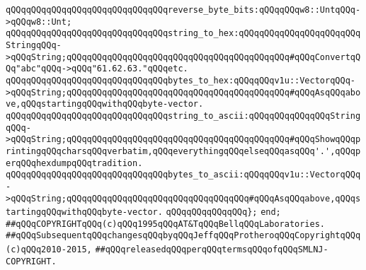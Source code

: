 \newline
\verb|qQQqqQQqqQQqqQQqqQQqqQQqqQQqqQQqreverse_byte_bits:qQQqqQQqw8::UntqQQq->qQQqw8::Unt;|\newline
\newline
\verb|qQQqqQQqqQQqqQQqqQQqqQQqqQQqqQQqstring_to_hex:qQQqqQQqqQQqqQQqqQQqqQQqStringqQQq->qQQqString;qQQqqQQqqQQqqQQqqQQqqQQqqQQqqQQqqQQqqQQqqQQq#qQQqConvertqQQq"abc"qQQq->qQQq"61.62.63."qQQqetc.|\newline
\verb|qQQqqQQqqQQqqQQqqQQqqQQqqQQqqQQqbytes_to_hex:qQQqqQQqv1u::VectorqQQq->qQQqString;qQQqqQQqqQQqqQQqqQQqqQQqqQQqqQQqqQQqqQQqqQQq#qQQqAsqQQqabove,qQQqstartingqQQqwithqQQqbyte-vector.|\newline
\newline
\verb|qQQqqQQqqQQqqQQqqQQqqQQqqQQqqQQqstring_to_ascii:qQQqqQQqqQQqqQQqStringqQQq->qQQqString;qQQqqQQqqQQqqQQqqQQqqQQqqQQqqQQqqQQqqQQqqQQq#qQQqShowqQQqprintingqQQqcharsqQQqverbatim,qQQqeverythingqQQqelseqQQqasqQQq'.',qQQqperqQQqhexdumpqQQqtradition.|\newline
\verb|qQQqqQQqqQQqqQQqqQQqqQQqqQQqqQQqbytes_to_ascii:qQQqqQQqv1u::VectorqQQq->qQQqString;qQQqqQQqqQQqqQQqqQQqqQQqqQQqqQQqqQQq#qQQqAsqQQqabove,qQQqstartingqQQqwithqQQqbyte-vector.|\newline
\verb|qQQqqQQqqQQqqQQq};|\newline
\verb|end;|\newline
\newline
\verb|##qQQqCOPYRIGHTqQQq(c)qQQq1995qQQqAT&TqQQqBellqQQqLaboratories.|\newline
\verb|##qQQqSubsequentqQQqchangesqQQqbyqQQqJeffqQQqProtheroqQQqCopyrightqQQq(c)qQQq2010-2015,|\newline
\verb|##qQQqreleasedqQQqperqQQqtermsqQQqofqQQqSMLNJ-COPYRIGHT.|\newline

